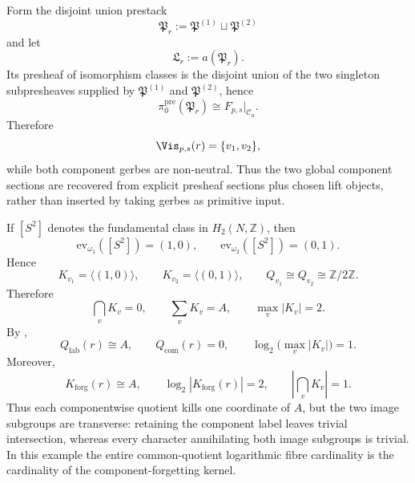 \begin{example}
Form the disjoint union prestack
\[
\mathfrak P_r:=\mathfrak P^{(1)}\sqcup \mathfrak P^{(2)}
\]
and let
\[
\mathfrak L_r:=a(\mathfrak P_r).
\]
Its presheaf of isomorphism classes is the disjoint union of the two singleton subpresheaves supplied by $\mathfrak P^{(1)}$ and $\mathfrak P^{(2)}$, hence
\[
\pi_0^{\mathrm{pre}}(\mathfrak P_r)\cong F_{p,s}|_{\mathcal C_a}.
\]
Therefore
\[
\Vis_{p,s}(r)=\{v_1,v_2\},
\]
while both component gerbes are non-neutral. Thus the two global component sections are recovered from explicit presheaf sections plus chosen lift objects, rather than inserted by taking gerbes as primitive input.

If $[S^2]$ denotes the fundamental class in $H_2(N,\mathbb Z)$, then
\[
\mathrm{ev}_{\omega_1}([S^2])=(1,0),
\qquad
\mathrm{ev}_{\omega_2}([S^2])=(0,1).
\]
Hence
\[
K_{v_1}=\langle(1,0)\rangle,
\qquad
K_{v_2}=\langle(0,1)\rangle,
\qquad
Q_{v_1}\cong Q_{v_2}\cong \mathbb Z/2\mathbb Z.
\]
Therefore
\[
\bigcap_{v} K_v=0,
\qquad
\sum_{v} K_v=A,
\qquad
\max_v |K_v|=2.
\]
By ,
\[
Q_{\mathrm{lab}}(r)\cong A,
\qquad
Q_{\mathrm{com}}(r)=0,
\qquad
\log_2\!\bigl(\max_v |K_v|\bigr)=1.
\]
Moreover,
\[
K_{\mathrm{forg}}(r)\cong A,
\qquad
\log_2|K_{\mathrm{forg}}(r)|=2,
\qquad
\left|\bigcap_v K_v\right|=1.
\]
Thus each componentwise quotient kills one coordinate of $A$, but the two
image subgroups are transverse: retaining the component label leaves trivial
intersection, whereas every character annihilating both image subgroups is
trivial. In this example the entire common-quotient logarithmic fibre
cardinality is the cardinality of the component-forgetting kernel.
\end{example}
